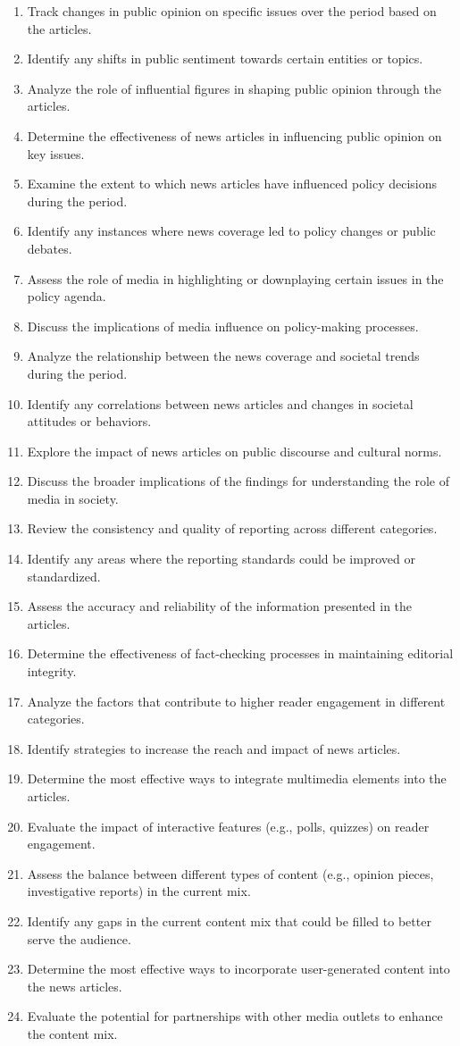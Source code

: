 \begin{footnotesize}
\begin{enumerate}
\item Track changes in public opinion on specific issues over the period based on the articles.
\item Identify any shifts in public sentiment towards certain entities or topics.
\item Analyze the role of influential figures in shaping public opinion through the articles.
\item Determine the effectiveness of news articles in influencing public opinion on key issues.
\item Examine the extent to which news articles have influenced policy decisions during the period.
\item Identify any instances where news coverage led to policy changes or public debates.
\item Assess the role of media in highlighting or downplaying certain issues in the policy agenda.
\item Discuss the implications of media influence on policy-making processes.
\item Analyze the relationship between the news coverage and societal trends during the period.
\item Identify any correlations between news articles and changes in societal attitudes or behaviors.
\item Explore the impact of news articles on public discourse and cultural norms.
\item Discuss the broader implications of the findings for understanding the role of media in society.
\item Review the consistency and quality of reporting across different categories.
\item Identify any areas where the reporting standards could be improved or standardized.
\item Assess the accuracy and reliability of the information presented in the articles.
\item Determine the effectiveness of fact-checking processes in maintaining editorial integrity.
\item Analyze the factors that contribute to higher reader engagement in different categories.
\item Identify strategies to increase the reach and impact of news articles.
\item Determine the most effective ways to integrate multimedia elements into the articles.
\item Evaluate the impact of interactive features (e.g., polls, quizzes) on reader engagement.
\item Assess the balance between different types of content (e.g., opinion pieces, investigative reports) in the current mix.
\item Identify any gaps in the current content mix that could be filled to better serve the audience.
\item Determine the most effective ways to incorporate user-generated content into the news articles.
\item Evaluate the potential for partnerships with other media outlets to enhance the content mix.
\end{enumerate}
\end{footnotesize}
